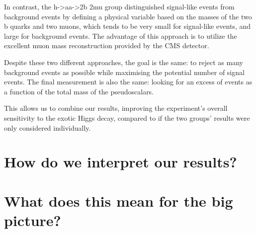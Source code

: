 \documentclass{article}
\begin{document}
In contrast, the h->aa->2b 2mu group distinguished signal-like events from background events by defining a physical variable based on the masses of the two b quarks and two muons, which tends to be very small for signal-like events,
and large for background events. The advantage of this approach is to utilize the excellent muon mass reconstruction provided by the CMS detector. 

Despite these two different approaches, the goal is the same: to reject as many background events as possible while maximising the potential number of signal events.
The final measurement is also the same: looking for an excess of events as a function of the total mass of the pseudoscalars. 

This allows us to combine our results, improving the experiment's overall sensitivity to the exotic Higgs decay, compared to if the two groups' results were only considered individually. 


\section{How do we interpret our results?}


\section{What does this mean for the big picture?}
\end{document}
